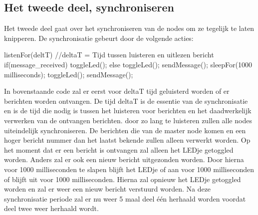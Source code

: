 \documentclass{article}
\begin{document}
\subsection{Het tweede deel, synchroniseren}
Het tweede deel gaat over het synchroniseren van de nodes om ze tegelijk te laten knipperen. De synchronisatie gebeurt door de volgende acties:
\begin{verbatimtab}
listenFor(deltT)       //deltaT = Tijd tussen luisteren en uitlezen bericht
if(message_received){
	toggleLed();
} else {
	toggleLed(); 
	sendMessage();
}
sleepFor(1000 milliseconds);
toggleLed();
sendMessage();
\end{verbatimtab}

In bovenstaande code zal er eerst voor deltaT tijd geluisterd worden of er berichten worden ontvangen.
De tijd deltaT is de essentie van de synchronisatie en is de tijd die nodig is tussen het luisteren voor berichten en het daadwerkelijk verwerken van de ontvangen berichten. door zo lang te luisteren zullen alle nodes uiteindelijk synchroniseren. De berichten die van de master node komen en een hoger bericht nummer dan het laatst bekende zullen alleen verwerkt worden. 
Op het moment dat er een bericht is ontvangen zal alleen het LEDje getoggled worden. Anders zal er ook een nieuw bericht uitgezonden worden. Door hierna voor 1000 milliseconden te slapen blijft het LEDje of aan voor 1000 milliseconden of blijft uit voor 1000 milliseconden. Hierna zal opnieuw het LEDje getoggled worden en zal er weer een nieuw bericht verstuurd worden. Na deze synchronisatie periode zal er nu weer 5 maal deel \'{e}\'{e}n herhaald worden voordat deel twee weer herhaald wordt. 
\newpage
\end{document}
